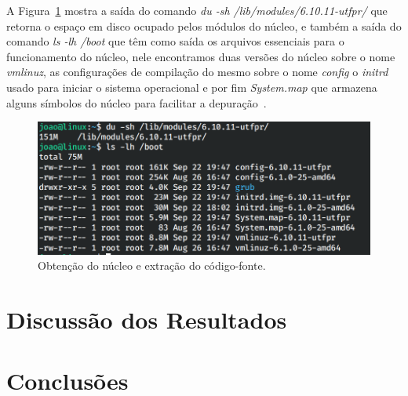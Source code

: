 \documentclass[
	12pt,				%
	oneside,   	        %
	a4paper,			%
	english,			%
	french,				%
	spanish,			%
	brazil,				%
	]{pacotes/abntex2}
\begin{document}
A Figura~\ref{fig:boot} mostra a saída do comando \textit{du -sh /lib/modules/6.10.11-utfpr/} que retorna o espaço em disco ocupado pelos módulos do núcleo, e também a saída do comando \textit{ls -lh /boot} que têm como saída os arquivos essenciais para o funcionamento do núcleo, nele encontramos duas versões do núcleo sobre o nome \textit{vmlinuz}, as configurações de compilação do mesmo sobre o nome \textit{config} o \textit{initrd} usado para iniciar o sistema operacional e por fim \textit{System.map} que armazena alguns símbolos do núcleo para facilitar a depuração~\cite{linuxKernel}.

\begin{figure}[H]
  \centering
  \includegraphics[scale=0.3]{figuras/boot.png}
  \caption{Obtenção do núcleo e extração do código-fonte.}
  \label{fig:boot}
\end{figure}

\section{Discussão dos Resultados}
\label{sec:discussao}

\section{Conclusões}
\label{sec:conclusoes}

\postextual
\renewcommand{\bibsection}{%
\section{\bibname}
\bibmark
\prebibhook}


\end{document}
